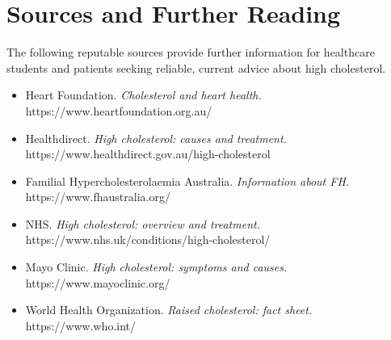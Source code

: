 \section*{Sources and Further Reading}
The following reputable sources provide further information for healthcare students and patients seeking reliable, current advice about high cholesterol.

\begin{itemize}
    \item Heart Foundation. \textit{Cholesterol and heart health.} https://www.heartfoundation.org.au/
    \item Healthdirect. \textit{High cholesterol: causes and treatment.} https://www.healthdirect.gov.au/high-cholesterol
    \item Familial Hypercholesterolaemia Australia. \textit{Information about FH.} https://www.fhaustralia.org/
    \item NHS. \textit{High cholesterol: overview and treatment.} https://www.nhs.uk/conditions/high-cholesterol/
    \item Mayo Clinic. \textit{High cholesterol: symptoms and causes.} https://www.mayoclinic.org/
    \item World Health Organization. \textit{Raised cholesterol: fact sheet.} https://www.who.int/
\end{itemize}
